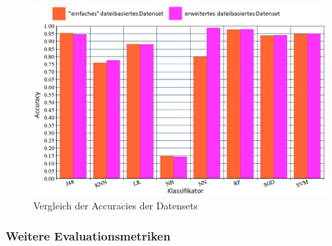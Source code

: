 \begin{figure}[t]
    \centering
    \includegraphics[width=\textwidth]{images/final_eval}
    \caption{Vergleich der Accuracies der Datensets\label{fig:final-eval}}
\end{figure}

\subsubsection*{Weitere Evaluationsmetriken}

